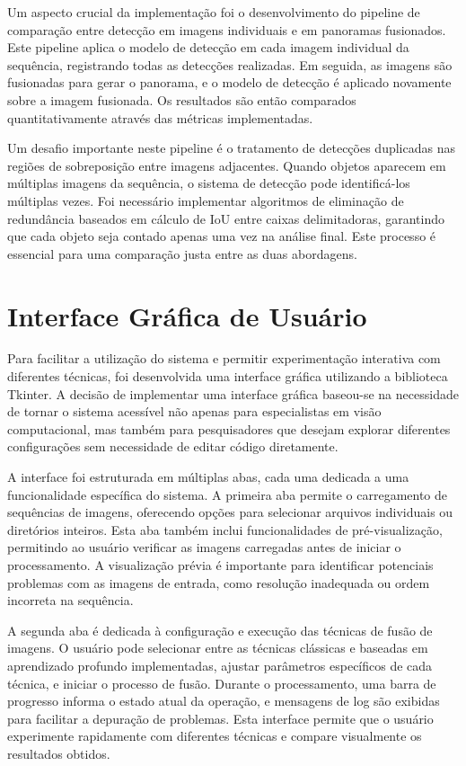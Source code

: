Um aspecto crucial da implementação foi o desenvolvimento do pipeline de comparação entre detecção em imagens individuais e em panoramas fusionados. Este pipeline aplica o modelo de detecção em cada imagem individual da sequência, registrando todas as detecções realizadas. Em seguida, as imagens são fusionadas para gerar o panorama, e o modelo de detecção é aplicado novamente sobre a imagem fusionada. Os resultados são então comparados quantitativamente através das métricas implementadas.

Um desafio importante neste pipeline é o tratamento de detecções duplicadas nas regiões de sobreposição entre imagens adjacentes. Quando objetos aparecem em múltiplas imagens da sequência, o sistema de detecção pode identificá-los múltiplas vezes. Foi necessário implementar algoritmos de eliminação de redundância baseados em cálculo de IoU entre caixas delimitadoras, garantindo que cada objeto seja contado apenas uma vez na análise final. Este processo é essencial para uma comparação justa entre as duas abordagens.

\section{Interface Gráfica de Usuário}

Para facilitar a utilização do sistema e permitir experimentação interativa com diferentes técnicas, foi desenvolvida uma interface gráfica utilizando a biblioteca Tkinter. A decisão de implementar uma interface gráfica baseou-se na necessidade de tornar o sistema acessível não apenas para especialistas em visão computacional, mas também para pesquisadores que desejam explorar diferentes configurações sem necessidade de editar código diretamente.

A interface foi estruturada em múltiplas abas, cada uma dedicada a uma funcionalidade específica do sistema. A primeira aba permite o carregamento de sequências de imagens, oferecendo opções para selecionar arquivos individuais ou diretórios inteiros. Esta aba também inclui funcionalidades de pré-visualização, permitindo ao usuário verificar as imagens carregadas antes de iniciar o processamento. A visualização prévia é importante para identificar potenciais problemas com as imagens de entrada, como resolução inadequada ou ordem incorreta na sequência.

A segunda aba é dedicada à configuração e execução das técnicas de fusão de imagens. O usuário pode selecionar entre as técnicas clássicas e baseadas em aprendizado profundo implementadas, ajustar parâmetros específicos de cada técnica, e iniciar o processo de fusão. Durante o processamento, uma barra de progresso informa o estado atual da operação, e mensagens de log são exibidas para facilitar a depuração de problemas. Esta interface permite que o usuário experimente rapidamente com diferentes técnicas e compare visualmente os resultados obtidos.

